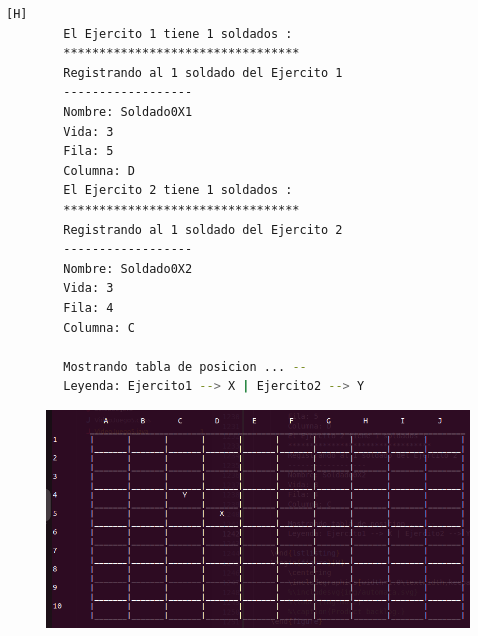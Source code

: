 \documentclass{article}
\begin{document}
	\begin{lstlisting}[language=bash,caption={Ejecucion:}][H]
		El Ejercito 1 tiene 1 soldados : 
		*********************************
		Registrando al 1 soldado del Ejercito 1
		------------------
		Nombre: Soldado0X1
		Vida: 3
		Fila: 5
		Columna: D
		El Ejercito 2 tiene 1 soldados : 
		*********************************
		Registrando al 1 soldado del Ejercito 2
		------------------
		Nombre: Soldado0X2
		Vida: 3
		Fila: 4
		Columna: C

		Mostrando tabla de posicion ... --
		Leyenda: Ejercito1 --> X | Ejercito2 --> Y

	\end{lstlisting}
	\begin{figure}[H]
		\centering
		\includegraphics[width=1.0\textwidth,keepaspectratio]{img/Commit8.png}
	\end{figure}
\end{document}
